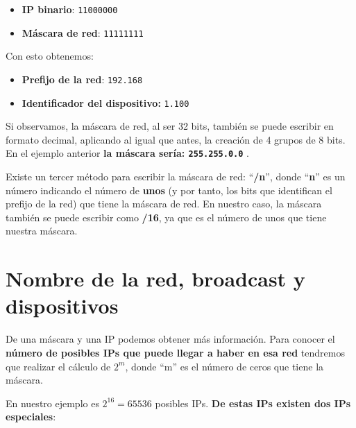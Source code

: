 \begin{itemize}
    \item \textbf{IP binario}:\hspace{25pt} \texttt{11000000\space{}\space{}\space{}}
    \item \textbf{Máscara de red}: \texttt{11111111\space{}\space{}\space{}}
\end{itemize}

Con esto obtenemos:
\begin{itemize}
    \item \textbf{Prefijo de la red}: \texttt{192.168}
    \item \textbf{Identificador del dispositivo:} \texttt{1.100}
\end{itemize}

Si observamos, la máscara de red, al ser 32 bits, también se puede escribir en formato decimal, aplicando al igual que antes, la creación de 4 grupos de 8 bits. En el ejemplo anterior \textbf{la máscara sería: \texttt{255.255.0.0}} .

Existe un tercer método para escribir la máscara de red:  “\textbf{/n}”, donde “\textbf{n}” es un número indicando el número de \textbf{unos} (y por tanto, los bits que identifican el prefijo de la red) que tiene la máscara de red. En nuestro caso, la máscara también se puede escribir como \textbf{/16}, ya que es el número de unos que tiene nuestra máscara.

\section{Nombre de la red, broadcast y dispositivos}

De una máscara y una IP podemos obtener más información. Para conocer el \textbf{número de posibles IPs que puede llegar a haber en esa red} tendremos que realizar el cálculo de $2^{m}$, donde “m” es el número de ceros que tiene la máscara.

En nuestro ejemplo es $2^{16} = 65536$ posibles IPs. \textbf{De estas IPs existen dos IPs especiales}:

